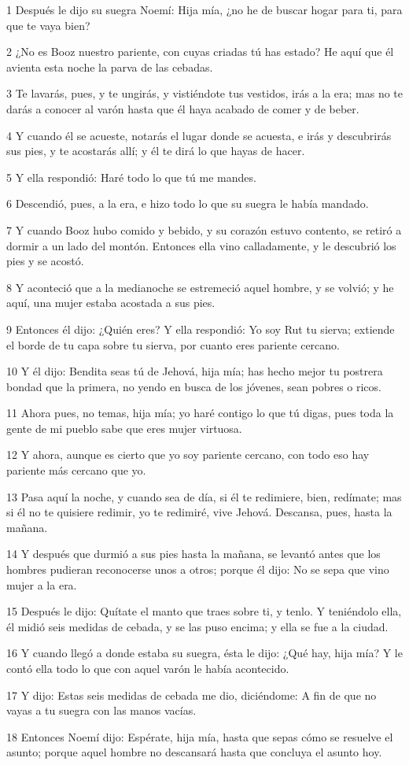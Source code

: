 \par 1 Después le dijo su suegra Noemí: Hija mía, ¿no he de buscar hogar para ti, para que te vaya bien?
\par 2 ¿No es Booz nuestro pariente, con cuyas criadas tú has estado? He aquí que él avienta esta noche la parva de las cebadas.
\par 3 Te lavarás, pues, y te ungirás, y vistiéndote tus vestidos, irás a la era; mas no te darás a conocer al varón hasta que él haya acabado de comer y de beber.
\par 4 Y cuando él se acueste, notarás el lugar donde se acuesta, e irás y descubrirás sus pies, y te acostarás allí; y él te dirá lo que hayas de hacer.
\par 5 Y ella respondió: Haré todo lo que tú me mandes.
\par 6 Descendió, pues, a la era, e hizo todo lo que su suegra le había mandado.
\par 7 Y cuando Booz hubo comido y bebido, y su corazón estuvo contento, se retiró a dormir a un lado del montón. Entonces ella vino calladamente, y le descubrió los pies y se acostó.
\par 8 Y aconteció que a la medianoche se estremeció aquel hombre, y se volvió; y he aquí, una mujer estaba acostada a sus pies.
\par 9 Entonces él dijo: ¿Quién eres? Y ella respondió: Yo soy Rut tu sierva; extiende el borde de tu capa sobre tu sierva, por cuanto eres pariente cercano.
\par 10 Y él dijo: Bendita seas tú de Jehová, hija mía; has hecho mejor tu postrera bondad que la primera, no yendo en busca de los jóvenes, sean pobres o ricos.
\par 11 Ahora pues, no temas, hija mía; yo haré contigo lo que tú digas, pues toda la gente de mi pueblo sabe que eres mujer virtuosa.
\par 12 Y ahora, aunque es cierto que yo soy pariente cercano, con todo eso hay pariente más cercano que yo.
\par 13 Pasa aquí la noche, y cuando sea de día, si él te redimiere, bien, redímate; mas si él no te quisiere redimir, yo te redimiré, vive Jehová. Descansa, pues, hasta la mañana.
\par 14 Y después que durmió a sus pies hasta la mañana, se levantó antes que los hombres pudieran reconocerse unos a otros; porque él dijo: No se sepa que vino mujer a la era.
\par 15 Después le dijo: Quítate el manto que traes sobre ti, y tenlo. Y teniéndolo ella, él midió seis medidas   de cebada, y se las puso encima; y ella se fue a la ciudad.
\par 16 Y cuando llegó a donde estaba su suegra, ésta le dijo: ¿Qué hay, hija mía? Y le contó ella todo lo que con aquel varón le había acontecido.
\par 17 Y dijo: Estas seis medidas   de cebada me dio, diciéndome: A fin de que no vayas a tu suegra con las manos vacías.
\par 18 Entonces Noemí dijo: Espérate, hija mía, hasta que sepas cómo se resuelve el asunto; porque aquel hombre no descansará hasta que concluya el asunto hoy.

